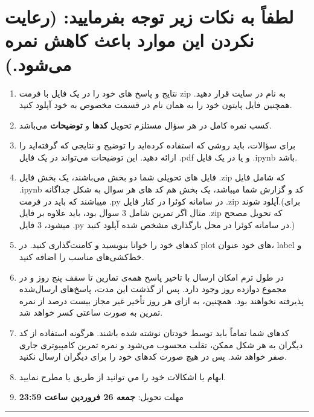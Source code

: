 \documentclass[a4paper]{article}
\begin{document}
\section*{
لطفاً به نکات زیر توجه بفرمایید: (رعایت نکردن این موارد باعث کاهش نمره می‌شود.)
}
\begin{enumerate}
	\item 
نتایج و پاسخ های خود را در یک فایل با فرمت zip به نام
 در سایت  
\href{https://quera.org/overview/add_to_course/course/10631}{} 
 قرار دهید. همچنین فایل پایتون خود را به همان نام در قسمت مخصوص به خود آپلود کنید.
	\item 
کسب نمره کامل در هر سؤال مستلزم تحویل  \textbf{کدها} و \textbf{توضیحات} می‌باشد. 
\item 
برای سؤالات، باید روشی که استفاده کرده‌اید را توضیح  و نتایجی که گرفته‌اید را ارائه دهید. این توضیحات می‌تواند در یک فایل  .pdf  و یا در یک فایل  .ipynb باشد. 
\item
فایل های تحویلی شما دو بخش می‌باشند، یک بخش فایل .zip که شامل فایل .ipynb کد و گزارش شما میباشد، یک بخش هم کد های هر سوال به شکل جداگانه میباشند که باید در فرمت .py در سامانه کوئرا در کنار فایل .zip آپلود شوند.(برای مثال اگر تمرین شامل 3 سوال بود، باید علاوه بر فایل .zip که تحویل مصحح میشود، 3 فایل .py در سامانه کوئرا در محل بارگذاری مشخص شده آپلود کنید.)
\item 
کدهای خود را خوانا بنویسید و کامنت‌‌گذاری کنید. در plot های خود عنوان، label و خط‌کشی‌های مناسب را اضافه کنید.
\item
در طول ترم امکان ارسال با تاخیر پاسخ  همه‌ی تمارین تا سقف پنج روز و در مجموع دوازده روز وجود دارد. پس از گذشت این مدت، پاسخ‌های ارسال‌شده پذیرفته نخواهند بود. همچنین، به ازای هر روز تأخیر غیر مجاز  بیست درصد از نمره تمرین به صورت ساعتی کسر خواهد شد.
\item
کدهای شما تماماً باید توسط خودتان نوشته شده باشند. هرگونه استفاده از کد دیگران به هر شکل ممکن، تقلب محسوب می‌شود و نمره تمرین کامپیوتری جاری صفر خواهد شد. پس در هیچ صورت کدهای خود را برای دیگران ارسال نکنید.
\item 
ابهام يا اشكالات خود را مي توانيد  از طریق
\href{mailto:smmzdr@gmail.com}{}
یا 
\href{mailto:javadiamirhosein.2000@gmail.com}{}
مطرح نماييد.
\item 
مهلت تحویل:  
\textbf{
	جمعه 26 فروردین ساعت 23:59 
}
\end{enumerate}
\rule[0.1\baselineskip]{\textwidth}{1.5pt}

\clearpage
\end{document}
